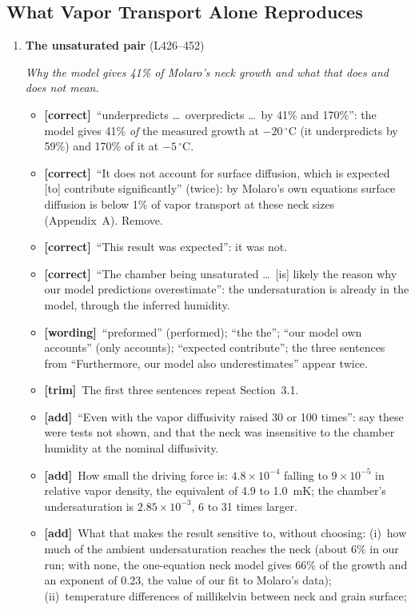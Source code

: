 \documentclass[11pt]{article}
\newcommand{\Pg}[3]{\item \textbf{#1} {\small(#2)}\par\textit{#3}}
\newcommand{\tC}{\textcolor{miss}{\textbf{[correct]}}\ }
\newcommand{\tG}{\textcolor{stale}{\textbf{[wording]}}\ }
\newcommand{\tT}{\textcolor{cut}{\textbf{[trim]}}\ }
\newcommand{\tA}{\textcolor{have}{\textbf{[add]}}\ }
\begin{document}
\subsection{What Vapor Transport Alone Reproduces}
\begin{enumerate}
\Pg{The unsaturated pair}{L426--452}{Why the model gives 41\% of Molaro's neck growth and what that does and does not mean.}
  \begin{itemize}
  \item \tC ``underpredicts \ldots\ overpredicts \ldots\ by 41\% and 170\%'':
    the model gives 41\% \emph{of} the measured growth at $-20\,^{\circ}$C
    (it underpredicts by 59\%) and 170\% of it at $-5\,^{\circ}$C.
  \item \tC ``It does not account for surface diffusion, which is expected
    [to] contribute significantly'' (twice): by Molaro's own equations
    surface diffusion is below 1\% of vapor transport at these neck sizes
    (Appendix~A). Remove.
  \item \tC ``This result was expected'': it was not.
  \item \tC ``The chamber being unsaturated \ldots\ [is] likely the reason
    why our model predictions overestimate'': the undersaturation is
    already in the model, through the inferred humidity.
  \item \tG ``preformed'' (performed); ``the the''; ``our model own
    accounts'' (only accounts); ``expected contribute''; the three
    sentences from ``Furthermore, our model also underestimates'' appear
    twice.
  \item \tT The first three sentences repeat Section~3.1.
  \item \tA ``Even with the vapor diffusivity raised 30 or 100 times'': say
    these were tests not shown, and that the neck was insensitive to the
    chamber humidity at the nominal diffusivity.
  \item \tA How small the driving force is: $4.8\times10^{-4}$ falling to
    $9\times10^{-5}$ in relative vapor density, the equivalent of 4.9 to
    1.0~mK; the chamber's undersaturation is $2.85\times10^{-3}$, 6 to 31
    times larger.
  \item \tA What that makes the result sensitive to, without choosing:
    (i)~how much of the ambient undersaturation reaches the neck (about 6\%
    in our run; with none, the one-equation neck model gives 66\% of the
    growth and an exponent of 0.23, the value of our fit to Molaro's data); (ii)~temperature
    differences of millikelvin between neck and grain surface;

\end{itemize}
\end{enumerate}
\end{document}
